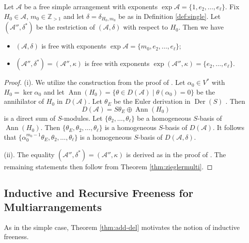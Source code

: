 \begin{proposition}
\label{prop:single}
Let ${{\mathcal A}}$ be a free simple arrangement with
exponents $\exp {{\mathcal A}} = \{1, e_2, \ldots, e_\ell\}$.
Fix $H_0 \in {{\mathcal A}}$, $m_0 \in {{\mathbb Z}}_{>1}$ and let 
$\delta = \delta_{H_0,m_0}$ be 
as in Definition \ref{def:single}.
Let  $({{\mathcal A}}'', \delta^*)$ be the restriction of 
$({{\mathcal A}}, \delta)$ with respect to $H_0$. 
Then we have
\begin{itemize}
\item[(i)] 
$({{\mathcal A}}, \delta)$ is free with exponents
$\exp {{\mathcal A}} = \{m_0, e_2, \ldots, e_\ell\}$;
\item[(ii)] 
$({{\mathcal A}}'', \delta^*) = ({{\mathcal A}}'', \kappa)$ is free with exponents
$\exp  ({{\mathcal A}}'', \kappa) = \{e_2, \ldots, e_\ell\}$.
\end{itemize}
\end{proposition}

\begin{proof}
(i).
We utilize the construction from 
the proof of \cite[Prop.\ 4.27]{orlikterao:arrangements}.
Let $\alpha_0 \in V^*$ with $H_0 = \ker \alpha_0$
and let ${{\operatorname{Ann}}}(H_0) = \{\theta \in D({{\mathcal A}}) \mid \theta(\alpha_0) = 0\}$
be the annihilator of $H_0$ in $D({{\mathcal A}})$.
Let $\theta_E$ be the Euler derivation in ${{\operatorname{Der}}}(S)$ 
\cite[Def.\ 4.7]{orlikterao:arrangements}.
Then
\[
D({{\mathcal A}}) = S \theta_E \oplus {{\operatorname{Ann}}}(H_0)
\]
is a direct sum of $S$-modules.
Let $\{\theta_2, \ldots, \theta_\ell\}$ be a homogeneous
$S$-basis of ${{\operatorname{Ann}}}(H_0)$.
Then $\{\theta_E, \theta_2, \ldots, \theta_\ell\}$ is a homogeneous
$S$-basis of $D({{\mathcal A}})$.
It follows that 
$\{\alpha_0^{m_0-1} \theta_E, \theta_2, \ldots, \theta_\ell\}$ is a homogeneous
$S$-basis of $D({{\mathcal A}}, \delta)$.

(ii). The equality $({{\mathcal A}}'', \delta^*) = ({{\mathcal A}}'', \kappa)$
is derived as in the proof of 
\cite[Prop.\ 5.2]{abeteraowakefield:euler}.
The remaining statements then follow from 
Theorem \ref{thm:zieglermulti}. 
\end{proof}

\subsection{Inductive and Recursive Freeness for Multiarrangements}
\label{subsec:indutive}
As in the simple case, Theorem \ref{thm:add-del} motivates 
the notion of inductive freeness. 

